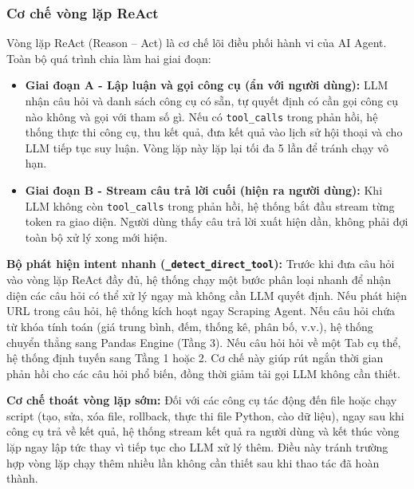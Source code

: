 \subsubsection{Cơ chế vòng lặp ReAct}
\label{subsubsec:react_loop}

Vòng lặp ReAct (Reason -- Act) là cơ chế lõi điều phối hành vi của AI Agent. Toàn bộ quá trình chia làm hai giai đoạn:

\begin{itemize}
    \item \textbf{Giai đoạn A - Lập luận và gọi công cụ (ẩn với người dùng):}
    LLM nhận câu hỏi và danh sách công cụ có sẵn, tự quyết định có cần gọi công cụ nào không và gọi với tham số gì. Nếu có \texttt{tool\_calls} trong phản hồi, hệ thống thực thi công cụ, thu kết quả, đưa kết quả vào lịch sử hội thoại và cho LLM tiếp tục suy luận. Vòng lặp này lặp lại tối đa 5 lần để tránh chạy vô hạn.
    \item \textbf{Giai đoạn B - Stream câu trả lời cuối (hiện ra người dùng):}
    Khi LLM không còn \texttt{tool\_calls} trong phản hồi, hệ thống bắt đầu stream từng token ra giao diện. Người dùng thấy câu trả lời xuất hiện dần, không phải đợi toàn bộ xử lý xong mới hiện.
\end{itemize}

\noindent\textbf{Bộ phát hiện intent nhanh (\texttt{\_detect\_direct\_tool}):}
Trước khi đưa câu hỏi vào vòng lặp ReAct đầy đủ, hệ thống chạy một bước phân loại nhanh để nhận diện các câu hỏi có thể xử lý ngay mà không cần LLM quyết định. Nếu phát hiện URL trong câu hỏi, hệ thống kích hoạt ngay Scraping Agent. Nếu câu hỏi chứa từ khóa tính toán (giá trung bình, đếm, thống kê, phân bố, v.v.), hệ thống chuyển thẳng sang Pandas Engine (Tầng 3). Nếu câu hỏi hỏi về một Tab cụ thể, hệ thống định tuyến sang Tầng 1 hoặc 2. Cơ chế này giúp rút ngắn thời gian phản hồi cho các câu hỏi phổ biến, đồng thời giảm tải gọi LLM không cần thiết.

\noindent\textbf{Cơ chế thoát vòng lặp sớm:}
Đối với các công cụ tác động đến file hoặc chạy script (tạo, sửa, xóa file, rollback, thực thi file Python, cào dữ liệu), ngay sau khi công cụ trả về kết quả, hệ thống stream kết quả ra người dùng và kết thúc vòng lặp ngay lập tức thay vì tiếp tục cho LLM xử lý thêm. Điều này tránh trường hợp vòng lặp chạy thêm nhiều lần không cần thiết sau khi thao tác đã hoàn thành.

